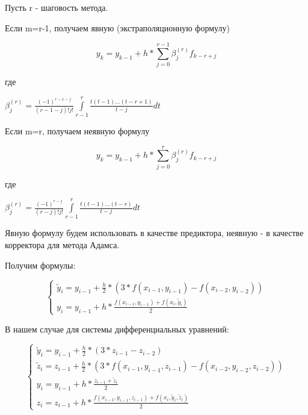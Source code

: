 Пусть r - шаговость метода. 

Если m=r-1, получаем явную (экстраполяционную формулу)

\begin{equation}
	y_{k}=y_{k-1}+h*\sum\limits_{j=0}^{r-1}\beta_{j}^{(r)}f_{k-r+j}
\end{equation}

где

\begin{math}
	\beta_{j}^{(r)}=\frac{(-1)^{r-1-j}}{(r-1-j)!j!}\int\limits_{r-1}^{r}\frac{t(t-1)...(t-r+1)}{t-j}dt
\end{math}

Если m=r, получаем неявную формулу

\begin{equation}
	y_{k}=y_{k-1}+h*\sum\limits_{j=0}^{r}\beta_{j}^{(r)}f_{k-r+j}
\end{equation}

где

\begin{math}
	\beta_{j}^{(r)}=\frac{(-1)^{r-j}}{(r-j)!j!}\int\limits_{r-1}^{r}\frac{t(t-1)...(t-r)}{t-j}dt
\end{math}

Явную формулу будем использовать в качестве предиктора, неявную - в качестве корректора для метода Адамса. 

Получим формулы:

\begin{equation}
	\begin{cases}
		\tilde y_{i}=y_{i-1}+\frac{h}{2}*(3*f(x_{i-1},y_{i-1})-f(x_{i-2},y_{i-2})) \\
		y_{i}=y_{i-1}+h*\frac{f(x_{i-1},y_{i-1})+f(x_{i},\tilde y_{i})}{2}
	\end{cases}
\end{equation}

В нашем случае для системы дифференциальных уравнений:

\begin{equation}
	\begin{cases}
		\tilde y_{i} = y_{i-1} + \frac{h}{2} * (3*z_{i-1}-z_{i-2}) \\
		\tilde z_{i}= z_{i-1}+\frac{h}{2}*(3*f(x_{i-1},y_{i-1},z_{i-1})-f(x_{i-2},y_{i-2},z_{i-2})) \\
		y_{i} = y_{i-1} + h * \frac{z_{i-1}+\tilde z_{i}}{2} \\
		z_{i} = z_{i-1} + h * \frac{f(x_{i-1},y_{i-1},z_{i-1})+f(x_{i},\tilde y_{i},\tilde z_{i}) }{2} 
	\end{cases}
\end{equation}

